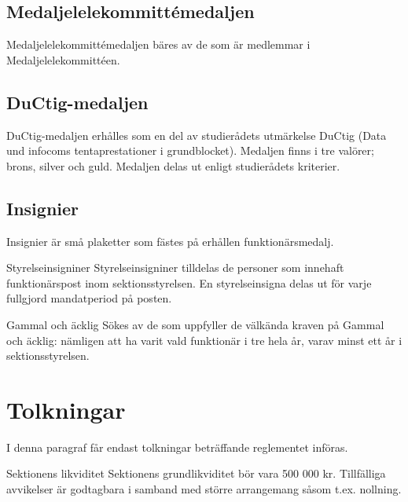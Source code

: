 \documentclass[pdfbookmarks,a4paper,11pt]{article}
\newlength{\itemcollength}
\newenvironment{reglemlista}{%
  \begin{list}{}{%
      \setlength{\labelwidth}{\itemcollength}%
      \setlength{\leftmargin}{\labelwidth + \labelsep}%
      \renewcommand{\makelabel}[1]{%
        \raisebox{0pt}[1ex][0pt]{%
          \makebox[\labelwidth][l]{%
            \parbox[t]{\itemcollength}{%
              \raggedright\hspace{0pt}##1}}}\hfill}%
      }}{%
  \end{list}}
\begin{document}
\subsection{Medaljelelekommittémedaljen}
Medaljelelekommittémedaljen bäres av de som är medlemmar i Medaljelelekommittéen.

\subsection{DuCtig-medaljen}
DuCtig-medaljen erhålles som en del av studierådets utmärkelse DuCtig (Data und infocoms tentaprestationer i grundblocket). Medaljen finns i tre valörer; brons, silver och guld. Medaljen delas ut enligt studierådets kriterier.

\subsection{Insignier}
Insignier är små plaketter som fästes på erhållen funktionärsmedalj.

\begin{reglemlista}
	\item[Styrelseinsigniner]
	Styrelseinsigniner tilldelas de personer som innehaft funktionärspost inom sektionsstyrelsen. En styrelseinsigna delas ut för varje fullgjord mandatperiod på posten.
	\item[Gammal och äcklig]
	Sökes av de som uppfyller de välkända kraven på Gammal och äcklig: nämligen att ha varit vald funktionär i tre hela år, varav minst ett år i sektionsstyrelsen.
\end{reglemlista}

\section{Tolkningar}

I denna paragraf får endast tolkningar beträffande reglementet införas.

\begin{reglemlista}

	\item[Sektionens likviditet]
	Sektionens grundlikviditet bör vara 500 000 kr. Tillfälliga avvikelser är godtagbara i samband med större arrangemang såsom t.ex. nollning.

\end{reglemlista}
\end{document}
